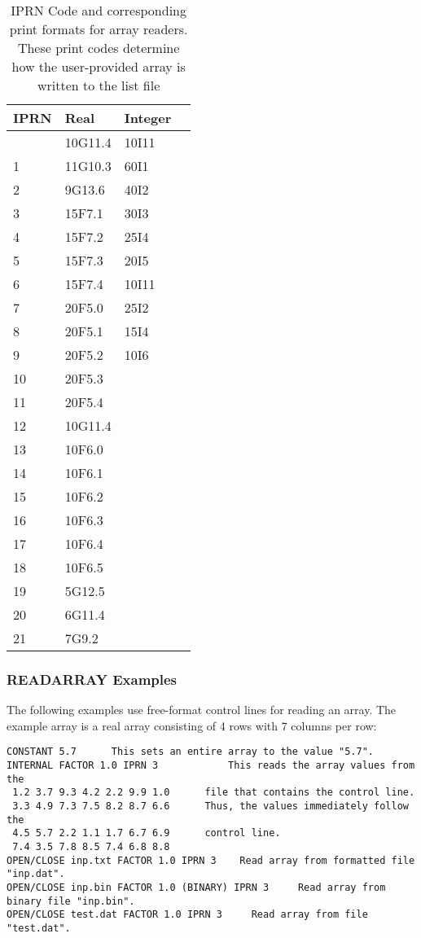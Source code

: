 \begin{longtable}{p{2cm} p{2cm} p{2cm} p{2cm}}
\caption{IPRN Code and corresponding print formats for array readers.  These print codes determine how the user-provided array is written to the list file} 
\tabularnewline
\hline
\hline
\textbf{IPRN} & \textbf{Real} & \textbf{Integer} \\
\hline
\endhead
\hline
\endfoot
0 & 10G11.4 & 10I11 \\
1 & 11G10.3 & 60I1 \\
2 & 9G13.6 & 40I2 \\
3 & 15F7.1 & 30I3 \\
4 & 15F7.2 & 25I4 \\
5 & 15F7.3 & 20I5 \\
6 & 15F7.4 & 10I11 \\
7 & 20F5.0 & 25I2 \\
8 & 20F5.1 & 15I4 \\
9 & 20F5.2 & 10I6 \\
10 & 20F5.3 &  \\
11 & 20F5.4 &  \\
12 & 10G11.4 & \\
13 & 10F6.0 &  \\
14 & 10F6.1 &  \\
15 & 10F6.2 &  \\
16 & 10F6.3 &  \\
17 & 10F6.4 &  \\
18 & 10F6.5 &  \\
19 & 5G12.5 &  \\
20 & 6G11.4 &  \\
21 & 7G9.2 &  \\
\end{longtable}


\subsubsection{READARRAY Examples}

The following examples use free-format control lines for reading an array. The example array is a real array consisting of 4 rows with 7 columns per row: 

\begin{lstlisting}[style=inputfile]
CONSTANT 5.7      This sets an entire array to the value "5.7". 
INTERNAL FACTOR 1.0 IPRN 3            This reads the array values from the 
 1.2 3.7 9.3 4.2 2.2 9.9 1.0      file that contains the control line. 
 3.3 4.9 7.3 7.5 8.2 8.7 6.6      Thus, the values immediately follow the 
 4.5 5.7 2.2 1.1 1.7 6.7 6.9      control line. 
 7.4 3.5 7.8 8.5 7.4 6.8 8.8 
OPEN/CLOSE inp.txt FACTOR 1.0 IPRN 3    Read array from formatted file "inp.dat". 
OPEN/CLOSE inp.bin FACTOR 1.0 (BINARY) IPRN 3     Read array from binary file "inp.bin". 
OPEN/CLOSE test.dat FACTOR 1.0 IPRN 3     Read array from file "test.dat". 
\end{lstlisting}


